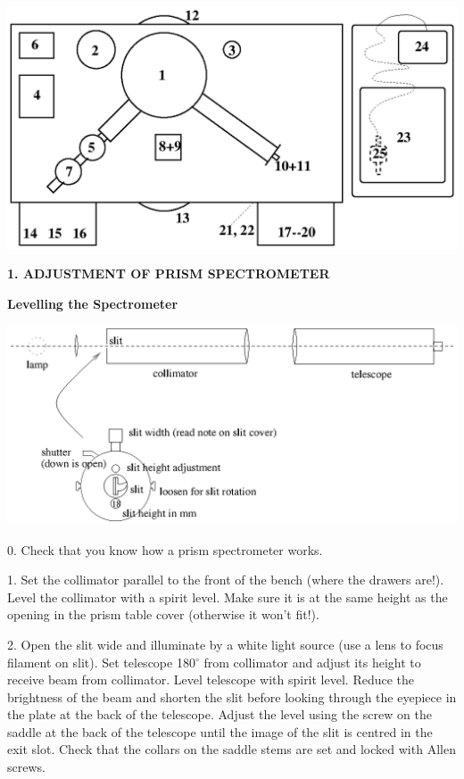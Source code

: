 \documentclass[12pt]{article}
\begin{document}
\begin{center}
\includegraphics{ap3labbench.ps}
\end{center}

\newpage





{\bf 1. ADJUSTMENT OF PRISM SPECTROMETER}

{\bf Levelling the Spectrometer}

\begin{center}
\includegraphics{ap3labspec0.ps}
\end{center}

0. Check that you know how a prism spectrometer works.

1. Set the collimator parallel to the front of the bench (where the drawers 
are!). Level the collimator with a spirit level. Make sure it is at the same
height as the  opening in the prism table cover (otherwise it won't fit!).

2. Open the slit wide and illuminate by a white light source (use a lens to
focus filament on slit).  Set telescope 180$^\circ$ from collimator and
adjust its height to receive beam from  collimator.  Level telescope
with spirit level.  Reduce the brightness of the beam  and shorten the
slit before looking through the eyepiece in the plate at
the back of the telescope.  Adjust the level using the screw on the saddle at the
back of the  telescope until the image of the slit is centred in the
exit slot. Check that the collars on the saddle stems are set and locked with 
Allen screws.
\end{document}
